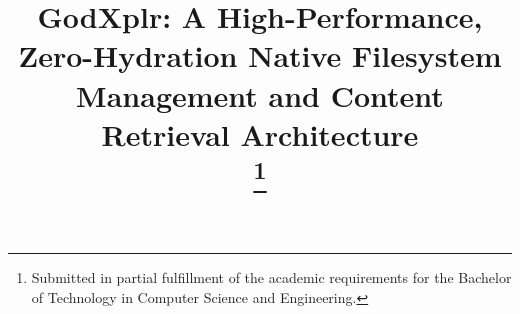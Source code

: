 \documentclass[conference]{IEEEtran}
\begin{document}
\title{GodXplr: A High-Performance, Zero-Hydration Native Filesystem Management and Content Retrieval Architecture\\
\thanks{Submitted in partial fulfillment of the academic requirements for the Bachelor of Technology in Computer Science and Engineering.}
}

\author{
}

\maketitle
\end{document}
